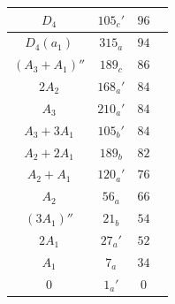 \documentclass[reqno,12pt]{amsart}
\numberwithin{equation}{section}
\theoremstyle{plain}
\theoremstyle{definition}
\begin{document}
\begin{table}[htbp]
{\begin{tabular}{|c|c|c|c|}
  $D_4$  &  $ 105_c'$  & $96$ \\
\hline
  $D_4(a_1)$  &  $315_a$  & $94$ \\
\hline
  $(A_3+A_1)''$  &  $189_c$  & $86$ \\
\hline
  $2A_2$  &  $168_a'$  & $84$ \\
  $A_3$  &  $210_a'$  & $84$ \\
  $A_3+3A_1$  &  $105_b'$  & $84$ \\
\hline
  $A_2+2A_1$  &  $189_b$  & $82$ \\
\hline
  $A_2+A_1$  &  $120_a'$  & $76$ \\
\hline
  $A_2$  &  $56_a$  & $66$ \\
\hline

  $(3A_1)''$  &  $21_b$  & $54$ \\
\hline
  $2A_1$  &  $27_a'$  & $52$ \\
\hline
  $A_1$  &  $7_a$  & $34$ \\
\hline
  $0$  &  $1_a'$  & $0$ \\
\hline

\end{tabular}}
	\bigskip
	\end{table}



\end{document}
